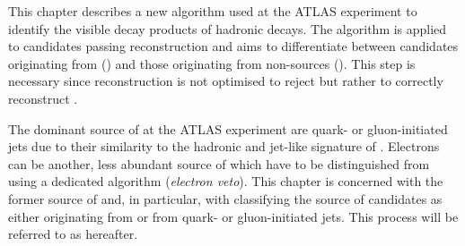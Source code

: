 This chapter describes a new algorithm used at the ATLAS experiment to
identify the visible decay products of hadronic \taulepton decays.
The algorithm is applied to \tauhadvis candidates passing \tauhadvis
reconstruction and aims to differentiate between candidates
originating from \tauhad (\truetauhadvis) and those originating from
non-\tauhad sources (\faketauhadvis). This step is necessary since
\tauhadvis reconstruction is not optimised to reject \faketauhadvis
but rather to correctly reconstruct \truetauhadvis.%

The dominant source of \faketauhadvis at the ATLAS experiment are
quark- or gluon-initiated jets due to their similarity to the hadronic
and jet-like signature of \tauhadvis. Electrons can be another, less
abundant source of \faketauhadvis which have to be distinguished from
\truetauhadvis using a dedicated algorithm (\emph{electron
  veto}). This chapter is concerned with the former source of
\faketauhadvis and, in particular, with classifying the source of
\tauhadvis candidates as either originating from \tauhad or from
quark- or gluon-initiated jets. This process will be referred to as
\tauid hereafter.

